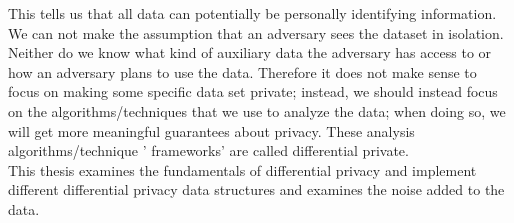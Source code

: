 \documentclass[11pt]{article}
\theoremstyle{definition}
\begin{document}
\noindent This tells us that all data can potentially be personally identifying information. We can not make the assumption that an adversary sees the dataset in isolation. Neither do we know what kind of auxiliary data the adversary has access to or how an adversary plans to use the data. Therefore it does not make sense to focus on making some specific data set private;  instead, we should instead focus on the algorithms/techniques that we use to analyze the data; when doing so, we will get more meaningful guarantees about privacy.  These analysis algorithms/technique ' frameworks' are called differential private.\\

This thesis examines the fundamentals of differential privacy and implement different differential privacy data structures and examines the noise added to the data.


\end{document}
